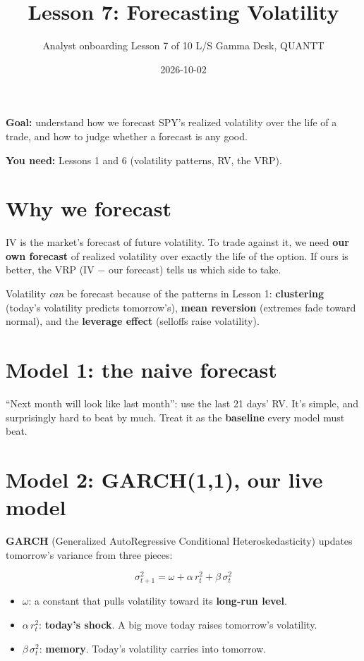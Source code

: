 \documentclass{article}
\title{Lesson 7: Forecasting Volatility}
\author{Analyst onboarding \textperiodcentered{} Lesson 7 of 10 \textperiodcentered{} L/S Gamma Desk, QUANTT}
\date{2026-10-02}
\begin{document}
\maketitle

\textbf{Goal:} understand how we forecast SPY's realized volatility over the life of a trade, and how to judge whether a forecast is any good.

\textbf{You need:} Lessons 1 and 6 (volatility patterns, RV, the VRP).

\section{Why we forecast}

IV is the market's forecast of future volatility. To trade against it, we need \textbf{our own forecast} of realized volatility over exactly the life of the option. If ours is better, the VRP (IV \ensuremath{-} our forecast) tells us which side to take.

Volatility \emph{can} be forecast because of the patterns in Lesson 1: \textbf{clustering} (today's volatility predicts tomorrow's), \textbf{mean reversion} (extremes fade toward normal), and the \textbf{leverage effect} (selloffs raise volatility).

\section{Model 1: the naive forecast}

``Next month will look like last month'': use the last 21 days' RV. It's simple, and surprisingly hard to beat by much. Treat it as the \textbf{baseline} every model must beat.

\section{Model 2: GARCH(1,1), our live model}

\textbf{GARCH} (Generalized AutoRegressive Conditional Heteroskedasticity) updates tomorrow's variance from three pieces:

\[\sigma^2_{t+1} = \omega + \alpha\, r_t^2 + \beta\, \sigma^2_t\]

\begin{itemize}

\item $\omega$: a constant that pulls volatility toward its \textbf{long-run level}.

\item $\alpha\, r_t^2$: \textbf{today's shock}. A big move today raises tomorrow's volatility.

\item $\beta\, \sigma^2_t$: \textbf{memory}. Today's volatility carries into tomorrow.

\end{itemize}
\end{document}

